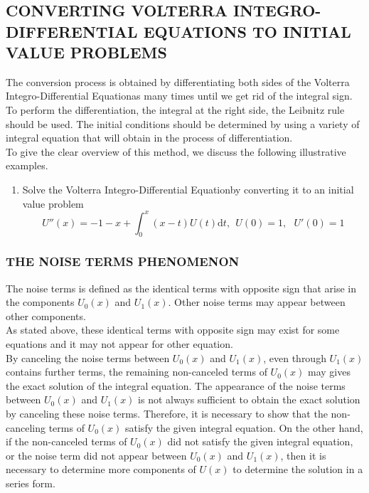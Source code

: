 \documentclass[12pt]{report}
\newcommand{\NI}{\noindent}
\newcommand{\IDE}{Integro-Differential Equation}
\begin{document}
	\chapter{}
	\section{CONVERTING VOLTERRA INTEGRO-DIFFERENTIAL EQUATIONS TO INITIAL VALUE PROBLEMS}
	The conversion process is obtained by differentiating both sides of the Volterra \IDE as many times until we get rid of the integral sign. To perform the differentiation, the integral at the right side, the Leibnitz rule should be used. The initial conditions should be determined by using a variety of integral equation that will obtain in the process of differentiation.\\
	
	\NI To give the clear overview of this method, we discuss the following illustrative examples.
	\begin{enumerate}
		\item Solve the Volterra \IDE by converting it to an initial value problem
		\begin{equation}
			U''(x) = -1-x+\int_0^x (x-t)U(t)\text{d}t,~~ U(0)=1,~~~ U'(0)=1
		\end{equation}
	\end{enumerate}
	
	\subsection{THE NOISE TERMS PHENOMENON}
	The noise terms is defined as the identical terms with opposite sign that arise in the components $U_0(x)$ and $U_1(x)$. Other noise terms may appear between other components.\\
	
	\NI As stated above, these identical terms with opposite sign may exist for some equations and it may not appear for other equation.\\
	
	\NI By canceling the noise terms between $U_0(x)$ and $U_1(x)$, even through $U_1(x)$ contains further terms, the remaining non-canceled terms of $U_0(x)$ may gives the exact solution of the integral equation. The appearance of the noise terms between $U_0(x)$ and $U_1(x)$ is not always sufficient to obtain the exact solution by canceling these noise terms. Therefore, it is necessary to show that the non-canceling terms of $U_0(x)$ satisfy the given integral equation. On the other hand, if the non-canceled terms of $U_0(x)$ did not satisfy the given integral equation, or the noise term did not appear between $U_0(x)$ and $U_1(x)$, then it is necessary to determine more components of $U(x)$ to determine the solution in a series form.\\
	
\end{document}
